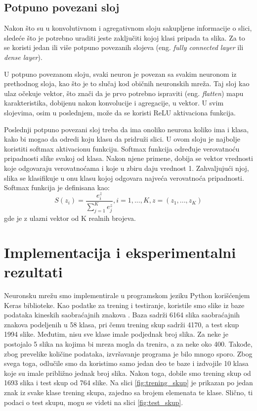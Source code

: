 \documentclass[a4paper]{article}
\begin{document}
\subsection{Potpuno povezani sloj}

Nakon što su u konvolutivnom i agregativnom sloju sakupljene informacije o slici, sledeće što je potrebno uraditi jeste zaključiti kojoj klasi pripada ta slika. Za to se koristi jedan ili više potpuno povezanih slojeva (eng. \textit{fully connected layer} ili \textit{dense layer}). 

U potpuno povezanom sloju, svaki neuron je povezan sa svakim neuronom iz prethodnog sloja, kao što je to slučaj kod običnih neuronskih mreža. Taj sloj kao ulaz očekuje vektor, što znači da je prvo potrebno ispraviti (eng. \textit{flatten}) mapu karakteristika, dobijenu nakon konvolucije i agregacije, u vektor. U svim slojevima, osim u poslednjem, može da se koristi ReLU aktivaciona funkcija.

Poslednji potpuno povezani sloj treba da ima onoliko neurona koliko ima i klasa, kako bi mogao da odredi koju klasu da pridruži slici. U ovom sloju je najbolje koristiti softmax aktivacionu funkciju. Softmax funkcija određuje verovatnoću pripadnosti slike svakoj od klasa. Nakon njene primene, dobija se vektor vrednosti koje odgovaraju verovatnoćama i koje u zbiru daju vrednost 1. Zahvaljujući njoj, slika se klasifikuje u onu klasu kojoj odgovara najveća verovatnoća pripadnosti. Softmax funkcija je definisana kao: $$ S(z_i) = \frac{e^z_i}{\sum_{j=1}^{K}e^z_j},  i = 1,...,K,  z = (z_1,...,z_K) $$ gde je z ulazni vektor od K realnih brojeva. 




\section{Implementacija i eksperimentalni rezultati}
\label{sec:podnaslov8}


Neuronsku mrežu smo implementirale u programskom jeziku Python korišćenjem Keras biblioteke. Kao podatke za trening i testiranje, koristile smo slike iz baze podataka kineskih saobraćajnih znakova \cite{CTSD}. Baza sadrži 6164 slika saobraćajnih znakova podeljenih u 58 klasa, pri čemu trening skup sadrži 4170, a test skup 1994 slike. Međutim, nisu sve klase imale podjednak broj slika. Za neke je postojalo 5 slika na kojima bi mreza mogla da trenira, a za neke oko 400. Takođe, zbog prevelike količine podataka, izvršavanje programa je bilo mnogo sporo. Zbog svega toga, odlučile smo da koristimo samo jedan deo te baze i izdvojile 10 klasa koje su imale približno jednak broj slika. Nakon toga, dobile smo trening skup od 1693 slika i test skup od 764 slike. Na slici \ref{fig:trening_skup} je prikazan po jedan znak iz svake klase trening skupa, zajedno sa brojem elemenata te klase. Slično, ti podaci o test skupu, mogu se videti na slici \ref{fig:test_skup}.
\end{document}
